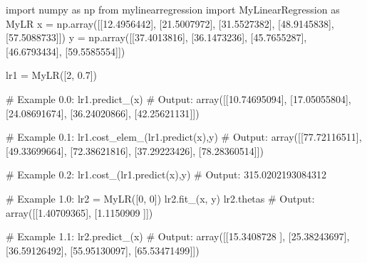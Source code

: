 \documentclass[]{article}
\newenvironment{Shaded}{\begin{snugshade}}{\end{snugshade}}
\newcommand{\CommentTok}[1]{\textcolor[rgb]{0.48,0.49,0.49}{#1}}
\newcommand{\DecValTok}[1]{\textcolor[rgb]{0.96,0.45,0.00}{#1}}
\newcommand{\FloatTok}[1]{\textcolor[rgb]{0.96,0.45,0.00}{#1}}
\newcommand{\ImportTok}[1]{\textcolor[rgb]{0.15,0.68,0.38}{#1}}
\newcommand{\NormalTok}[1]{\textcolor[rgb]{0.81,0.81,0.76}{#1}}
\newcommand{\OperatorTok}[1]{\textcolor[rgb]{0.81,0.81,0.76}{#1}}
\begin{document}
\begin{Shaded}
\begin{Highlighting}[]
\ImportTok{import}\NormalTok{ numpy }\ImportTok{as}\NormalTok{ np}
\ImportTok{from}\NormalTok{ mylinearregression }\ImportTok{import}\NormalTok{ MyLinearRegression }\ImportTok{as}\NormalTok{ MyLR}
\NormalTok{x }\OperatorTok{=}\NormalTok{ np.array([[}\FloatTok{12.4956442}\NormalTok{], [}\FloatTok{21.5007972}\NormalTok{], [}\FloatTok{31.5527382}\NormalTok{], [}\FloatTok{48.9145838}\NormalTok{], [}\FloatTok{57.5088733}\NormalTok{]])}
\NormalTok{y }\OperatorTok{=}\NormalTok{ np.array([[}\FloatTok{37.4013816}\NormalTok{], [}\FloatTok{36.1473236}\NormalTok{], [}\FloatTok{45.7655287}\NormalTok{], [}\FloatTok{46.6793434}\NormalTok{], [}\FloatTok{59.5585554}\NormalTok{]])}

\NormalTok{lr1 }\OperatorTok{=}\NormalTok{ MyLR([}\DecValTok{2}\NormalTok{, }\FloatTok{0.7}\NormalTok{])}

\CommentTok{# Example 0.0:}
\NormalTok{lr1.predict_(x)}
\CommentTok{# Output:}
\NormalTok{array([[}\FloatTok{10.74695094}\NormalTok{],}
\NormalTok{       [}\FloatTok{17.05055804}\NormalTok{],}
\NormalTok{       [}\FloatTok{24.08691674}\NormalTok{],}
\NormalTok{       [}\FloatTok{36.24020866}\NormalTok{],}
\NormalTok{       [}\FloatTok{42.25621131}\NormalTok{]])}

\CommentTok{# Example 0.1:}
\NormalTok{lr1.cost_elem_(lr1.predict(x),y)}
\CommentTok{# Output:}
\NormalTok{array([[}\FloatTok{77.72116511}\NormalTok{],}
\NormalTok{       [}\FloatTok{49.33699664}\NormalTok{],}
\NormalTok{       [}\FloatTok{72.38621816}\NormalTok{],}
\NormalTok{       [}\FloatTok{37.29223426}\NormalTok{],}
\NormalTok{       [}\FloatTok{78.28360514}\NormalTok{]])}

\CommentTok{# Example 0.2:}
\NormalTok{lr1.cost_(lr1.predict(x),y)}
\CommentTok{# Output:}
\FloatTok{315.0202193084312}


\CommentTok{# Example 1.0:}
\NormalTok{lr2 }\OperatorTok{=}\NormalTok{ MyLR([}\DecValTok{0}\NormalTok{, }\DecValTok{0}\NormalTok{])}
\NormalTok{lr2.fit_(x, y)}
\NormalTok{lr2.thetas}
\CommentTok{# Output:}
\NormalTok{array([[}\FloatTok{1.40709365}\NormalTok{],}
\NormalTok{       [}\FloatTok{1.1150909}\NormalTok{ ]])}

\CommentTok{# Example 1.1:}
\NormalTok{lr2.predict_(x)}
\CommentTok{# Output:}
\NormalTok{array([[}\FloatTok{15.3408728}\NormalTok{ ],}
\NormalTok{       [}\FloatTok{25.38243697}\NormalTok{],}
\NormalTok{       [}\FloatTok{36.59126492}\NormalTok{],}
\NormalTok{       [}\FloatTok{55.95130097}\NormalTok{],}
\NormalTok{       [}\FloatTok{65.53471499}\NormalTok{]])}


\end{Highlighting}
\end{Shaded}
\end{document}
